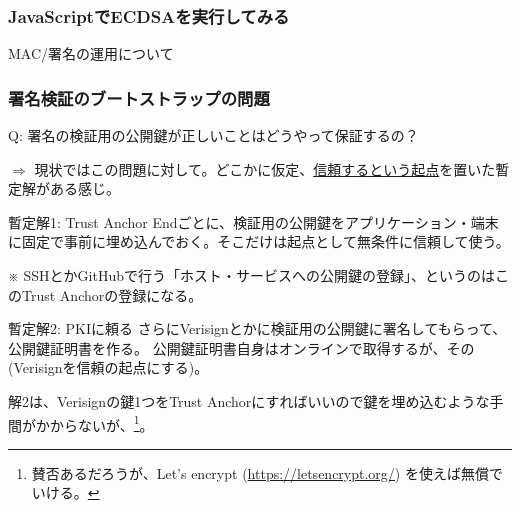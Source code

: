 \documentclass[12pt,dvipdfmx]{beamer}
\begin{document}
\begin{frame}
\frametitle{JavaScriptでECDSAを実行してみる}
\end{frame}



\begin{frame}
\centering
{\Large MAC/署名の運用について}
\end{frame}

\begin{frame}
\frametitle{署名検証のブートストラップの問題}

Q: \alert{署名の検証用の公開鍵が正しいことはどうやって保証するの？}

\vspace{2ex}

$\Rightarrow$ 現状ではこの問題に対して。どこかに仮定、\underline{信頼するという起点}を置いた暫定解がある感じ。


\end{frame}

\begin{frame}
\begin{block}{暫定解1: Trust Anchor}
Endごとに、\alert{検証用の公開鍵をアプリケーション・端末に固定で事前に埋め込んでおく}。そこだけは起点として無条件に信頼して使う。
\end{block}

※ SSHとかGitHubで行う「ホスト・サービスへの公開鍵の登録」、というのはこのTrust Anchorの登録になる。
\end{frame}

\begin{frame}
 
\begin{block}{暫定解2: PKIに頼る}
さらに\alert{Verisignとかに検証用の公開鍵に署名してもらって、公開鍵証明書を作る}。
公開鍵証明書自身はオンラインで取得するが、その(Verisignを信頼の起点にする)。
\end{block}

解2は、Verisignの鍵1つをTrust Anchorにすればいいので鍵を埋め込むような手間がかからないが、\footnote[frame]{\scriptsize 賛否あるだろうが、Let's encrypt (\url{https://letsencrypt.org/}) を使えば無償でいける。}。


\end{frame}
\end{document}
